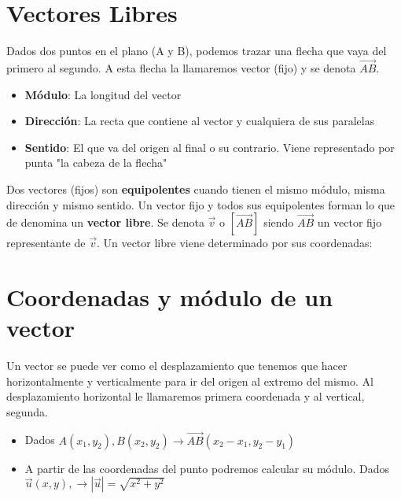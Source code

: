 

\section{Vectores Libres}

Dados dos puntos en el plano (A y B), podemos trazar  una flecha que vaya del primero al segundo. A esta flecha la llamaremos vector (fijo) y se denota $\overrightarrow{AB}$.







\begin{itemize}
\item \textbf{Módulo}: La longitud del vector
\item \textbf{Dirección}: La recta que contiene al vector y cualquiera de sus paralelas
\item \textbf{Sentido}: El que va del origen al final o su contrario. Viene representado por punta "la cabeza de la flecha"
\end{itemize}
Dos vectores (fijos) son \textbf{equipolentes} cuando tienen el mismo módulo, misma dirección y mismo sentido. Un vector fijo y todos sus equipolentes forman lo que de denomina un \textbf{vector libre}. Se denota $\overrightarrow{v}$ o $\left[\overrightarrow{AB}\right]$ siendo $\overrightarrow{AB}$ un vector fijo representante de $\overrightarrow{v}$. Un vector libre viene determinado por sus coordenadas:

\section{Coordenadas y módulo de un vector} Un vector se puede ver como el desplazamiento que tenemos que hacer horizontalmente y verticalmente para ir del origen al extremo del mismo. Al desplazamiento horizontal le llamaremos primera coordenada y al vertical, segunda.

\begin{itemize}
\item Dados $A(x_1,y_2),B(x_2,y_2) \to  \overrightarrow{AB}(x_2-x_1,y_2-y_1)$
\item A partir de las coordenadas del punto podremos calcular su módulo. Dados $\overrightarrow{u}(x,y), \to  \left|\overrightarrow{u}\right|=\sqrt{x^2+y^2}$
\end{itemize}




